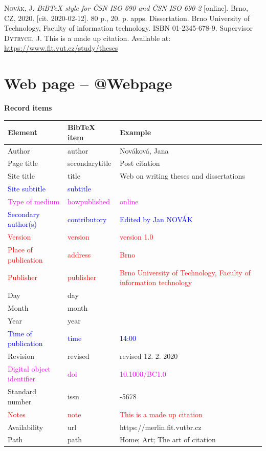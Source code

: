 \medskip

\noindent \textsc{Novák}, J. \textit{BiBTeX style for ČSN ISO 690 and ČSN ISO 690-2} [online]. Brno, CZ, 2020. [cit. 2020-02-12]. 80 p., 20. p. apps. Dissertation. Brno University of Technology, Faculty of information technology. ISBN 01-2345-678-9. Supervisor \textsc{Dytrych}, J. This is a made up citation. Available at: \url{https://www.fit.vut.cz/study/theses}
\newpage
\section*{Web page -- @Webpage}
\label{pr-webpage}
\noindent \textbf{Record items}

\medskip

\begin{tabularx}{0.95\linewidth}{X X >{\raggedright\arraybackslash}X}
    Element & BibTeX item & Example\\\hline
    Author & author & Nováková, Jana\\
    Page title & secondarytitle & Post citation\\
    Site title & title & Web on writing theses and dissertations\\
    \textcolor{blue}{Site subtitle}  &  \textcolor{blue}{subtitle} & \\
    \textcolor{magenta}{Type of medium} & \textcolor{magenta}{howpublished} & \textcolor{magenta}{online}\\
    \textcolor{blue}{Secondary author(s)} & \textcolor{blue}{contributory} & \textcolor{blue}{Edited by Jan NOVÁK}\\
    \textcolor{red}{Version} & \textcolor{red}{version} & \textcolor{red}{version 1.0}\\
    \textcolor{red}{Place of publication} & \textcolor{red}{address} & \textcolor{red}{Brno}\\
    \textcolor{red}{Publisher} & \textcolor{red}{publisher} & \textcolor{red}{Brno University of Technology, Faculty of information technology}\\
    Day & day & 12\\
    Month & month & 2\\
    Year & year & 2020\\
    \textcolor{blue}{Time of publication} & \textcolor{blue}{time} & \textcolor{blue}{14:00}\\
    Revision & revised & revised 12. 2. 2020\\
    \textcolor{magenta}{Digital object identifier} & \textcolor{magenta}{doi} & \textcolor{magenta}{10.1000/BC1.0}\\
    Standard number & issn & 1234-5678\\
    \textcolor{red}{Notes} & \textcolor{red}{note} & \textcolor{red}{This is a made up citation}\\
    Availability & url & https://merlin.fit.vutbr.cz\\
    Path & path & Home; Art; The art of citation
\end{tabularx}

